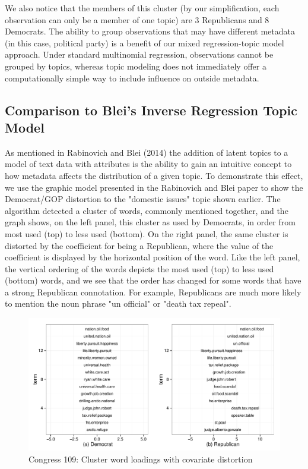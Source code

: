 \documentclass[12pt]{article}
\begin{document}
We also notice that the members of this cluster (by our simplification, each observation can only be a member of one topic) are 3 Republicans and 8 Democrats. 
The ability to group observations that may have different metadata (in this case, political party) is a benefit of our mixed regression-topic model approach. 
Under standard multinomial regression, observations cannot be grouped by topics, whereas topic modeling does not immediately offer a computationally simple way to include influence on outside metadata.

\subsection{Comparison to Blei's Inverse Regression Topic Model}
As mentioned in Rabinovich and Blei (2014) the addition of latent topics to a model of text data with attributes is the ability to gain an intuitive concept to how metadata affects the distribution of a given topic. 
To demonstrate this effect, we use the graphic model presented in the Rabinovich and Blei paper to show the Democrat/GOP distortion to the "domestic issues"  topic shown earlier. 
The algorithm detected a cluster of words, commonly mentioned together, and the graph shows, on the left panel, this cluster as used by Democrats, in order from most used (top) to less used (bottom). On the right panel, the same cluster is distorted by the coefficient for being a Republican, where the value of the coefficient is displayed by the horizontal position of the word. Like the left panel, the vertical ordering of the words depicts the most used (top) to less used (bottom) words, and we see that the order has changed for some words that have a strong Republican connotation. For example, Republicans are much more likely to mention the noun phrase "un official" or "death tax repeal". 

\begin{figure}[!htpb]
  \centering
\caption[Loadings]{Congress 109: Cluster word loadings with covariate distortion}
  \includegraphics[width=6.2in]{Images/Blei_Changing_Loadings_GOP.pdf}
\end{figure}
\end{document}
